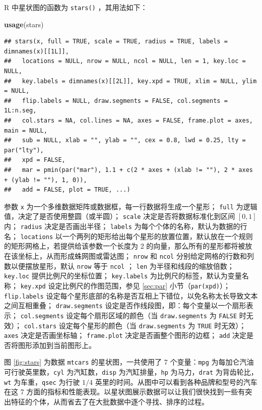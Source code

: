 \documentclass[
  b5paper,
  UTF8,twoside]{book}
\newenvironment{Shaded}{\begin{snugshade}}{\end{snugshade}}
\newcommand{\FunctionTok}[1]{\textcolor[rgb]{0.13,0.29,0.53}{\textbf{#1}}}
\newcommand{\NormalTok}[1]{#1}
\begin{document}
R 中星状图的函数为 \texttt{stars()} ，其用法如下：

\begin{Shaded}
\begin{Highlighting}[]
\FunctionTok{usage}\NormalTok{(stars)}
\end{Highlighting}
\end{Shaded}

\begin{verbatim}
## stars(x, full = TRUE, scale = TRUE, radius = TRUE, labels = dimnames(x)[[1L]],
##   locations = NULL, nrow = NULL, ncol = NULL, len = 1, key.loc = NULL,
##   key.labels = dimnames(x)[[2L]], key.xpd = TRUE, xlim = NULL, ylim = NULL,
##   flip.labels = NULL, draw.segments = FALSE, col.segments = 1L:n.seg,
##   col.stars = NA, col.lines = NA, axes = FALSE, frame.plot = axes, main = NULL,
##   sub = NULL, xlab = "", ylab = "", cex = 0.8, lwd = 0.25, lty = par("lty"),
##   xpd = FALSE,
##   mar = pmin(par("mar"), 1.1 + c(2 * axes + (xlab != ""), 2 * axes + (ylab != ""), 1, 0)),
##   add = FALSE, plot = TRUE, ...)
\end{verbatim}

参数 \texttt{x} 为一个多维数据矩阵或数据框，每一行数据将生成一个星形； \texttt{full} 为逻辑值，决定了是否使用整圆（或半圆）； \texttt{scale} 决定是否将数据标准化到区间 \([0,1]\) 内； \texttt{radius} 决定是否画出半径； \texttt{labels} 为每个个体的名称，默认为数据的行名； \texttt{locations} 以一个两列的矩形给出每个星形的放置位置，默认放在一个规则的矩形网格上，若提供给该参数一个长度为 2 的向量，那么所有的星形都将被放在该坐标上，从而形成蛛网图或雷达图； \texttt{nrow} 和 \texttt{ncol} 分别给定网格的行数和列数以便摆放星形，默认 \texttt{nrow} 等于 \texttt{ncol} ； \texttt{len} 为半径和线段的缩放倍数； \texttt{key.loc} 提供比例尺的坐标位置； \texttt{key.labels} 为比例尺的标签，默认为变量名称； \texttt{key.xpd} 设定比例尺的作图范围，参见 \ref{sec:par} 小节（\texttt{par(\textquotesingle{}xpd\textquotesingle{})}）； \texttt{flip.labels} 设定每个星形底部的名称是否互相上下错位，以免名称太长导致文本之间互相重叠； \texttt{draw.segments} 设定是否作线段图，即：每个变量以一个扇形表示； \texttt{col.segments} 设定每个扇形区域的颜色（当 \texttt{draw.segments} 为 \texttt{FALSE} 时无效）； \texttt{col.stars} 设定每个星形的颜色（当 \texttt{draw.segments} 为 \texttt{TRUE} 时无效）； \texttt{axes} 决定是否画坐标轴； \texttt{frame.plot} 决定是否画整个图形的边框； \texttt{add} 决定是否将图形添加到当前图形上。

图 \ref{fig:stars}
为数据 \texttt{mtcars} 的星状图，一共使用了 7 个变量：\texttt{mpg} 为每加仑汽油可行驶英里数，\texttt{cyl} 为汽缸数，\texttt{disp} 为汽缸排量，\texttt{hp} 为马力，\texttt{drat} 为背齿轮比，\texttt{wt} 为车重，\texttt{qsec} 为行驶 \(1/4\) 英里的时间。从图中可以看到各种品牌和型号的汽车在这 7 方面的指标和性能表现。以星状图展示数据可以让我们很快找到一些有突出特征的个体，从而省去了在大批数据中逐个寻找、排序的过程。
\end{document}
